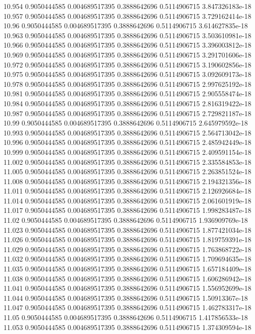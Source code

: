 {10.954 0.9050444585 0.004689517395 0.3888642696 0.5114906715 3.847326183e-18
10.957 0.9050444585 0.004689517395 0.3888642696 0.5114906715 3.729162414e-18
10.96 0.9050444585 0.004689517395 0.3888642696 0.5114906715 3.614627835e-18
10.963 0.9050444585 0.004689517395 0.3888642696 0.5114906715 3.503610981e-18
10.966 0.9050444585 0.004689517395 0.3888642696 0.5114906715 3.396003812e-18
10.969 0.9050444585 0.004689517395 0.3888642696 0.5114906715 3.291701606e-18
10.972 0.9050444585 0.004689517395 0.3888642696 0.5114906715 3.190602856e-18
10.975 0.9050444585 0.004689517395 0.3888642696 0.5114906715 3.092609173e-18
10.978 0.9050444585 0.004689517395 0.3888642696 0.5114906715 2.997625192e-18
10.981 0.9050444585 0.004689517395 0.3888642696 0.5114906715 2.905558474e-18
10.984 0.9050444585 0.004689517395 0.3888642696 0.5114906715 2.816319422e-18
10.987 0.9050444585 0.004689517395 0.3888642696 0.5114906715 2.729821187e-18
10.99 0.9050444585 0.004689517395 0.3888642696 0.5114906715 2.645979592e-18
10.993 0.9050444585 0.004689517395 0.3888642696 0.5114906715 2.564713042e-18
10.996 0.9050444585 0.004689517395 0.3888642696 0.5114906715 2.485942449e-18
10.999 0.9050444585 0.004689517395 0.3888642696 0.5114906715 2.409591154e-18
11.002 0.9050444585 0.004689517395 0.3888642696 0.5114906715 2.335584853e-18
11.005 0.9050444585 0.004689517395 0.3888642696 0.5114906715 2.263851524e-18
11.008 0.9050444585 0.004689517395 0.3888642696 0.5114906715 2.194321356e-18
11.011 0.9050444585 0.004689517395 0.3888642696 0.5114906715 2.126926684e-18
11.014 0.9050444585 0.004689517395 0.3888642696 0.5114906715 2.061601919e-18
11.017 0.9050444585 0.004689517395 0.3888642696 0.5114906715 1.998283487e-18
11.02 0.9050444585 0.004689517395 0.3888642696 0.5114906715 1.936909769e-18
11.023 0.9050444585 0.004689517395 0.3888642696 0.5114906715 1.877421034e-18
11.026 0.9050444585 0.004689517395 0.3888642696 0.5114906715 1.819759391e-18
11.029 0.9050444585 0.004689517395 0.3888642696 0.5114906715 1.763868722e-18
11.032 0.9050444585 0.004689517395 0.3888642696 0.5114906715 1.709694635e-18
11.035 0.9050444585 0.004689517395 0.3888642696 0.5114906715 1.657184409e-18
11.038 0.9050444585 0.004689517395 0.3888642696 0.5114906715 1.606286942e-18
11.041 0.9050444585 0.004689517395 0.3888642696 0.5114906715 1.556952699e-18
11.044 0.9050444585 0.004689517395 0.3888642696 0.5114906715 1.50913367e-18
11.047 0.9050444585 0.004689517395 0.3888642696 0.5114906715 1.462783317e-18
11.05 0.9050444585 0.004689517395 0.3888642696 0.5114906715 1.417856533e-18
11.053 0.9050444585 0.004689517395 0.3888642696 0.5114906715 1.374309594e-18
}
